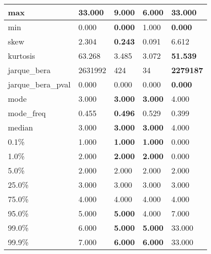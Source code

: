 \begin{table}[H]
\begin{tabular}{|l|m{10em}|m{10em}|m{10em}|m{10em}|}
\hline max & 33.000 & 9.000 & \cellcolor[rgb]{0.9, 0.54, 0.52} 6.000 & \bfseries 33.000 \\
\hline min & 0.000 & \bfseries 0.000 & \cellcolor[rgb]{0.9, 0.54, 0.52} 1.000 & \bfseries 0.000 \\
\hline skew & 2.304 & \bfseries 0.243 & 0.091 & \cellcolor[rgb]{0.9, 0.54, 0.52} 6.612 \\
\hline kurtosis & 63.268 & 3.485 & \cellcolor[rgb]{0.9, 0.54, 0.52} 3.072 & \bfseries 51.539 \\
\hline jarque\_bera & 2631992 & 424 & \cellcolor[rgb]{0.9, 0.54, 0.52} 34 & \bfseries 2279187 \\
\hline jarque\_bera\_pval & 0.000 & 0.000 & \cellcolor[rgb]{0.9, 0.54, 0.52} 0.000 & \bfseries 0.000 \\
\hline mode & 3.000 & \bfseries 3.000 & \bfseries 3.000 & \cellcolor[rgb]{0.9, 0.54, 0.52} 4.000 \\
\hline mode\_freq & 0.455 & \bfseries 0.496 & \cellcolor[rgb]{0.9, 0.54, 0.52} 0.529 & 0.399 \\
\hline median & 3.000 & \bfseries 3.000 & \bfseries 3.000 & \cellcolor[rgb]{0.9, 0.54, 0.52} 4.000 \\
\hline 0.1\% & 1.000 & \bfseries 1.000 & \bfseries 1.000 & \cellcolor[rgb]{0.9, 0.54, 0.52} 0.000 \\
\hline 1.0\% & 2.000 & \bfseries 2.000 & \bfseries 2.000 & \cellcolor[rgb]{0.9, 0.54, 0.52} 0.000 \\
\hline 5.0\% & 2.000 & 2.000 & 2.000 & 2.000 \\
\hline 25.0\% & 3.000 & 3.000 & 3.000 & 3.000 \\
\hline 75.0\% & 4.000 & 4.000 & 4.000 & 4.000 \\
\hline 95.0\% & 5.000 & \bfseries 5.000 & 4.000 & \cellcolor[rgb]{0.9, 0.54, 0.52} 7.000 \\
\hline 99.0\% & 6.000 & \bfseries 5.000 & \bfseries 5.000 & \cellcolor[rgb]{0.9, 0.54, 0.52} 33.000 \\
\hline 99.9\% & 7.000 & \bfseries 6.000 & \bfseries 6.000 & \cellcolor[rgb]{0.9, 0.54, 0.52} 33.000 \\
\hline
\end{tabular}
\end{table}

